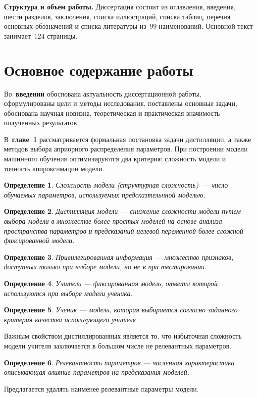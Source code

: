 \documentclass{dissert}
\newtheorem{definition}{Определение}
\begin{document}
\vspace{0.5cm}
\textbf{Структура и объем работы.} Диссертация состоит из оглавления, введения, шести разделов, заключения, списка иллюстраций, списка таблиц, перечня основных обозначений и списка литературы из~$99$ наименований. Основной текст занимает~$124$ страницы.

\section*{Основное содержание работы}
Во~\textbf{введении} обоснована актуальность диссертационной работы, сформулированы цели и методы исследования, поставлены основные задачи, обоснована научная новизна, теоретическая и практическая значимость полученных результатов.

В~\textbf{главе~1} рассматривается формальная постановка задачи дистилляции, а также методов выбора априорного распределения параметров.
При построении модели машинного обучения оптимизируются два критерия: сложность модели и точность аппроксимации модели.
\begin{definition}
Сложность модели (структурная сложность)~--- число обучаемых параметров, используемых предсказтельнной моделью.
\end{definition}

\begin{definition}
Дистилляция модели --- снижение сложности модели путем выбора модели в множестве более простых моделей на основе анализа пространства параметров и предсказаний целевой переменной более сложной фиксированной модели.
\end{definition}

\begin{definition}
Привилегированная информация --- множество признаков, доступных только при выборе модели, но не в при тестировании.
\end{definition}

\begin{definition}
Учитель --- фиксированная модель, ответы которой используются при выборе модели ученика.
\end{definition}

\begin{definition}
Ученик --- модель, которая выбирается согласно заданного критерия качества использующего учителя.
\end{definition}

Важным свойством дистиллированных является то, что избыточная сложность модели учителя заключается в большом числе не релевантных параметров.
\begin{definition}
Релевантность параметров --- численная характеристика описывающая влияние параметров на предсказания моделей.
\end{definition}
Предлагается удалять наименее релевантные параметры модели.
\end{document}
